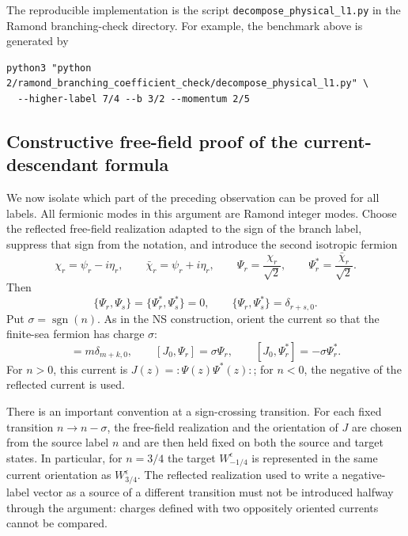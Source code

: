 \documentclass[11pt]{article}
\begin{document}
The reproducible implementation is the script
\texttt{decompose\_physical\_l1.py} in the Ramond branching-check directory.
For example, the benchmark above is generated by
\begin{verbatim}
python3 "python 2/ramond_branching_coefficient_check/decompose_physical_l1.py" \
  --higher-label 7/4 --b 3/2 --momentum 2/5
\end{verbatim}

\subsection{Constructive free-field proof of the current-descendant formula}

We now isolate which part of the preceding observation can be proved for
all labels.  All fermionic modes in this argument are Ramond integer modes.
Choose the reflected free-field realization adapted to the sign of the
branch label, suppress that sign from the notation, and introduce the second
isotropic fermion
\begin{equation}
 \chi_r=\psi_r-i\eta_r,
 \qquad
 \bar\chi_r=\psi_r+i\eta_r,
 \qquad
 \Psi_r=\frac{\chi_r}{\sqrt2},
 \qquad
 \Psi_r^*=\frac{\bar\chi_r}{\sqrt2}.
 \label{eq:ramond-complex-fermion}
\end{equation}
Then
\begin{equation}
 \{\Psi_r,\Psi_s\}=\{\Psi_r^*,\Psi_s^*\}=0,
 \qquad
 \{\Psi_r,\Psi_s^*\}=\delta_{r+s,0}.
\end{equation}
Put \(\sigma=\operatorname{sgn}(n)\).  As in the NS construction, orient
the current so that the finite-sea fermion has charge \(\sigma\):
\begin{equation}
 [J_m,J_k]=m\delta_{m+k,0},
 \qquad
 [J_0,\Psi_r]=\sigma\Psi_r,
 \qquad
 [J_0,\Psi_r^*]=-\sigma\Psi_r^*.
 \label{eq:ramond-current-convention}
\end{equation}
For \(n>0\), this current is
\(J(z)=:\!\Psi(z)\Psi^*(z)\!:\); for \(n<0\), the negative of the
reflected current is used.

There is an important convention at a sign-crossing transition.  For each
fixed transition \(n\to n-\sigma\), the free-field realization and the
orientation of \(J\) are chosen from the source label \(n\) and are then
held fixed on both the source and target states.  In particular, for
\(n=3/4\) the target \(W_{-1/4}^\epsilon\) is represented in the same
current orientation as \(W_{3/4}^\epsilon\).  The reflected realization
used to write a negative-label vector as a source of a different
transition must not be introduced halfway through the argument: charges
defined with two oppositely oriented currents cannot be compared.
\end{document}

